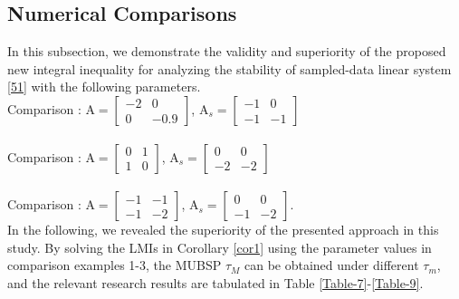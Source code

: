 \documentclass[preprint,11pt]{elsarticle}
\begin{document}
\subsection{Numerical Comparisons}
In this subsection, we demonstrate the validity and superiority of the proposed new integral inequality for analyzing the stability of sampled-data linear system \eqref{51} with the following parameters.\\
Comparison :
$\mathrm{A}=
\begin{bmatrix}
 -2&  0 \\
  0&   -0.9
\end{bmatrix}$,
$\mathrm{A}_s=
\begin{bmatrix}
 -1&   0 \\
  -1&   -1
\end{bmatrix}$\\\\
Comparison :
$\mathrm{A}=
\begin{bmatrix}
 0&  1 \\
  1&  0
\end{bmatrix}$,
$\mathrm{A}_s=
\begin{bmatrix}
 0&   0 \\
  -2&  -2
\end{bmatrix}$\\\\
Comparison :
$\mathrm{A}=
\begin{bmatrix}
 -1&  -1 \\
  -1&  -2
\end{bmatrix}$,
$\mathrm{A}_s=
\begin{bmatrix}
 0&   0 \\
  -1&  -2
\end{bmatrix}$.\\
In the following, we revealed the superiority of the presented approach in this study. By solving the LMIs in Corollary \ref{cor1} using the parameter values in comparison examples 1-3, the MUBSP $\tau_M$ can be obtained under different $\tau_m$, and the relevant research results are tabulated in Table \ref{Table-7}-\ref{Table-9}.
\vspace{-0.3cm}
\end{document}

